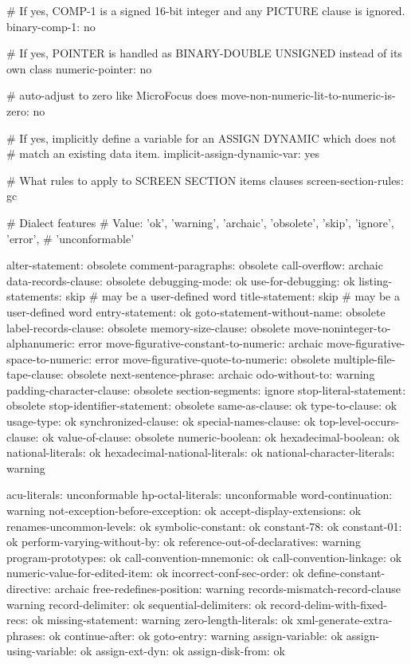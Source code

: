 # If yes, COMP-1 is a signed 16-bit integer and any PICTURE clause is ignored.
binary-comp-1:			no

# If yes, POINTER is handled as BINARY-DOUBLE UNSIGNED instead of its own class
numeric-pointer:		no

# auto-adjust to zero like MicroFocus does
move-non-numeric-lit-to-numeric-is-zero: no

# If yes, implicitly define a variable for an ASSIGN DYNAMIC which does not
# match an existing data item.
implicit-assign-dynamic-var:	yes

# What rules to apply to SCREEN SECTION items clauses
screen-section-rules:		gc

# Dialect features
# Value: 'ok', 'warning', 'archaic', 'obsolete', 'skip', 'ignore', 'error',
#        'unconformable'

alter-statement:			obsolete
comment-paragraphs:			obsolete
call-overflow:				archaic
data-records-clause:			obsolete
debugging-mode:				ok
use-for-debugging:			ok
listing-statements:			skip	# may be a user-defined word
title-statement:			skip	# may be a user-defined word
entry-statement:			ok
goto-statement-without-name:		obsolete
label-records-clause:			obsolete
memory-size-clause:			obsolete
move-noninteger-to-alphanumeric:	error
move-figurative-constant-to-numeric:	archaic
move-figurative-space-to-numeric:	error
move-figurative-quote-to-numeric:	obsolete
multiple-file-tape-clause:		obsolete
next-sentence-phrase:			archaic
odo-without-to:				warning
padding-character-clause:		obsolete
section-segments:			ignore
stop-literal-statement:			obsolete
stop-identifier-statement:		obsolete
same-as-clause:				ok
type-to-clause:				ok
usage-type:					ok
synchronized-clause:			ok
special-names-clause:			ok
top-level-occurs-clause:		ok
value-of-clause:			obsolete
numeric-boolean:			ok
hexadecimal-boolean:			ok
national-literals:			ok
hexadecimal-national-literals:		ok
national-character-literals:		warning

acu-literals:				unconformable
hp-octal-literals:			unconformable
word-continuation:			warning
not-exception-before-exception:		ok
accept-display-extensions:		ok
renames-uncommon-levels:		ok
symbolic-constant:			ok
constant-78:				ok
constant-01:				ok
perform-varying-without-by:		ok
reference-out-of-declaratives:		warning
program-prototypes:			ok
call-convention-mnemonic:		ok
call-convention-linkage:		ok
numeric-value-for-edited-item:		ok
incorrect-conf-sec-order:		ok
define-constant-directive:		archaic
free-redefines-position:		warning
records-mismatch-record-clause	warning
record-delimiter:			ok
sequential-delimiters:			ok
record-delim-with-fixed-recs:		ok
missing-statement:			warning
zero-length-literals:			ok
xml-generate-extra-phrases:		ok
continue-after:				ok
goto-entry:				warning
assign-variable:			ok
assign-using-variable:			ok
assign-ext-dyn:				ok
assign-disk-from:			ok

